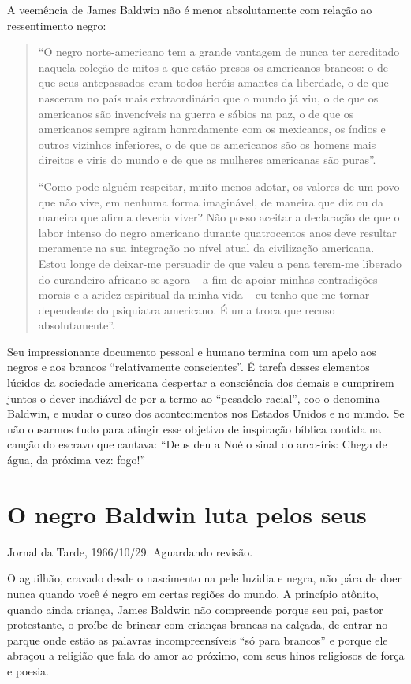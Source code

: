 \documentclass[
  letterpaper,
  DIV=11,
  numbers=noendperiod]{scrreprt}
\begin{document}
A veemência de James Baldwin não é menor absolutamente com relação ao
ressentimento negro:

\begin{quote}
``O negro norte-americano tem a grande vantagem de nunca ter acreditado
naquela coleção de mitos a que estão presos os americanos brancos: o de
que seus antepassados eram todos heróis amantes da liberdade, o de que
nasceram no país mais extraordinário que o mundo já viu, o de que os
americanos são invencíveis na guerra e sábios na paz, o de que os
americanos sempre agiram honradamente com os mexicanos, os índios e
outros vizinhos inferiores, o de que os americanos são os homens mais
direitos e viris do mundo e de que as mulheres americanas são puras''.

``Como pode alguém respeitar, muito menos adotar, os valores de um povo
que não vive, em nenhuma forma imaginável, de maneira que diz ou da
maneira que afirma deveria viver? Não posso aceitar a declaração de que
o labor intenso do negro americano durante quatrocentos anos deve
resultar meramente na sua integração no nível atual da civilização
americana. Estou longe de deixar-me persuadir de que valeu a pena
terem-me liberado do curandeiro africano se agora -- a fim de apoiar
minhas contradições morais e a aridez espiritual da minha vida -- eu
tenho que me tornar dependente do psiquiatra americano. É uma troca que
recuso absolutamente''.
\end{quote}

Seu impressionante documento pessoal e humano termina com um apelo aos
negros e aos brancos ``relativamente conscientes''. É tarefa desses
elementos lúcidos da sociedade americana despertar a consciência dos
demais e cumprirem juntos o dever inadiável de por a termo ao ``pesadelo
racial'', coo o denomina Baldwin, e mudar o curso dos acontecimentos nos
Estados Unidos e no mundo. Se não ousarmos tudo para atingir esse
objetivo de inspiração bíblica contida na canção do escravo que cantava:
``Deus deu a Noé o sinal do arco-íris: Chega de água, da próxima vez:
fogo!''

\chapter{O negro Baldwin luta pelos
seus}\label{o-negro-baldwin-luta-pelos-seus}

Jornal da Tarde, 1966/10/29. Aguardando revisão.

\hfill\break

O aguilhão, cravado desde o nascimento na pele luzidia e negra, não pára
de doer nunca quando você é negro em certas regiões do mundo. A
princípio atônito, quando ainda criança, James Baldwin não compreende
porque seu pai, pastor protestante, o proíbe de brincar com crianças
brancas na calçada, de entrar no parque onde estão as palavras
incompreensíveis ``só para brancos'' e porque ele abraçou a religião que
fala do amor ao próximo, com seus hinos religiosos de força e poesia.
\end{document}
